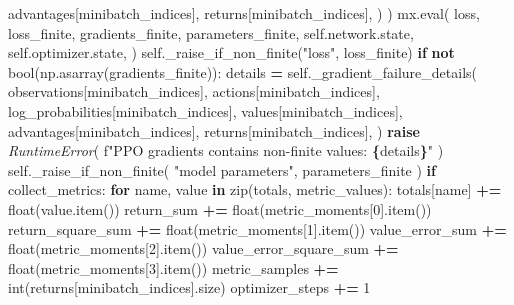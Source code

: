 \documentclass[
  american,
  11pt,
  letterpaper,
]{article}
\newenvironment{Shaded}{\begin{snugshade}}{\end{snugshade}}
\newcommand{\BuiltInTok}[1]{#1}
\newcommand{\ControlFlowTok}[1]{\textcolor[rgb]{0.13,0.29,0.53}{\textbf{#1}}}
\newcommand{\DecValTok}[1]{\textcolor[rgb]{0.00,0.00,0.81}{#1}}
\newcommand{\KeywordTok}[1]{\textcolor[rgb]{0.13,0.29,0.53}{\textbf{#1}}}
\newcommand{\NormalTok}[1]{#1}
\newcommand{\OperatorTok}[1]{\textcolor[rgb]{0.81,0.36,0.00}{\textbf{#1}}}
\newcommand{\PreprocessorTok}[1]{\textcolor[rgb]{0.56,0.35,0.01}{\textit{#1}}}
\newcommand{\SpecialCharTok}[1]{\textcolor[rgb]{0.81,0.36,0.00}{\textbf{#1}}}
\newcommand{\SpecialStringTok}[1]{\textcolor[rgb]{0.31,0.60,0.02}{#1}}
\newcommand{\StringTok}[1]{\textcolor[rgb]{0.31,0.60,0.02}{#1}}
\newcommand{\VariableTok}[1]{\textcolor[rgb]{0.00,0.00,0.00}{#1}}
\renewenvironment{Shaded}{\par\smallskip}{\par\smallskip}
\begin{document}
\begin{Shaded}
\begin{Highlighting}[]
\NormalTok{                            advantages[minibatch\_indices],}
\NormalTok{                            returns[minibatch\_indices],}
\NormalTok{                        )}
\NormalTok{                    )}
\NormalTok{                mx.}\BuiltInTok{eval}\NormalTok{(}
\NormalTok{                    loss,}
\NormalTok{                    loss\_finite,}
\NormalTok{                    gradients\_finite,}
\NormalTok{                    parameters\_finite,}
                    \VariableTok{self}\NormalTok{.network.state,}
                    \VariableTok{self}\NormalTok{.optimizer.state,}
\NormalTok{                )}
                \VariableTok{self}\NormalTok{.\_raise\_if\_non\_finite(}\StringTok{"loss"}\NormalTok{, loss\_finite)}
                \ControlFlowTok{if} \KeywordTok{not} \BuiltInTok{bool}\NormalTok{(np.asarray(gradients\_finite)):}
\NormalTok{                    details }\OperatorTok{=} \VariableTok{self}\NormalTok{.\_gradient\_failure\_details(}
\NormalTok{                        observations[minibatch\_indices],}
\NormalTok{                        actions[minibatch\_indices],}
\NormalTok{                        log\_probabilities[minibatch\_indices],}
\NormalTok{                        values[minibatch\_indices],}
\NormalTok{                        advantages[minibatch\_indices],}
\NormalTok{                        returns[minibatch\_indices],}
\NormalTok{                    )}
                    \ControlFlowTok{raise} \PreprocessorTok{RuntimeError}\NormalTok{(}
                        \SpecialStringTok{f"PPO gradients contains non{-}finite values: }\SpecialCharTok{\{}\NormalTok{details}\SpecialCharTok{\}}\SpecialStringTok{"}
\NormalTok{                    )}
                \VariableTok{self}\NormalTok{.\_raise\_if\_non\_finite(}
                    \StringTok{"model parameters"}\NormalTok{, parameters\_finite}
\NormalTok{                )}
                \ControlFlowTok{if}\NormalTok{ collect\_metrics:}
                    \ControlFlowTok{for}\NormalTok{ name, value }\KeywordTok{in} \BuiltInTok{zip}\NormalTok{(totals, metric\_values):}
\NormalTok{                        totals[name] }\OperatorTok{+=} \BuiltInTok{float}\NormalTok{(value.item())}
\NormalTok{                    return\_sum }\OperatorTok{+=} \BuiltInTok{float}\NormalTok{(metric\_moments[}\DecValTok{0}\NormalTok{].item())}
\NormalTok{                    return\_square\_sum }\OperatorTok{+=} \BuiltInTok{float}\NormalTok{(metric\_moments[}\DecValTok{1}\NormalTok{].item())}
\NormalTok{                    value\_error\_sum }\OperatorTok{+=} \BuiltInTok{float}\NormalTok{(metric\_moments[}\DecValTok{2}\NormalTok{].item())}
\NormalTok{                    value\_error\_square\_sum }\OperatorTok{+=} \BuiltInTok{float}\NormalTok{(metric\_moments[}\DecValTok{3}\NormalTok{].item())}
\NormalTok{                    metric\_samples }\OperatorTok{+=} \BuiltInTok{int}\NormalTok{(returns[minibatch\_indices].size)}
\NormalTok{                    optimizer\_steps }\OperatorTok{+=} \DecValTok{1}


\end{Highlighting}
\end{Shaded}
\end{document}
